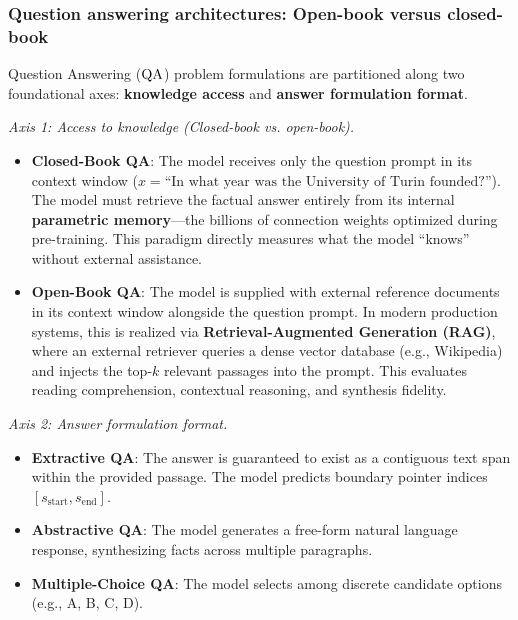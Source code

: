 \documentclass[../../../main.tex]{subfiles}
\begin{document}
\subsubsection{Question answering architectures: Open-book versus closed-book}
\label{subsec:question_answering}
Question Answering ($\mathrm{QA}$) problem formulations are partitioned along two foundational axes: \textbf{knowledge access} and \textbf{answer formulation format}.

\textit{Axis 1: Access to knowledge (Closed-book vs. open-book).}
\begin{itemize}
    \item \textbf{Closed-Book QA}: The model receives only the question prompt in its context window ($x = \text{``In what year was the University of Turin founded?''}$). The model must retrieve the factual answer entirely from its internal \textbf{parametric memory}---the billions of connection weights optimized during pre-training. This paradigm directly measures what the model ``knows'' without external assistance.
    \item \textbf{Open-Book QA}: The model is supplied with external reference documents in its context window alongside the question prompt. In modern production systems, this is realized via \textbf{Retrieval-Augmented Generation (RAG)}, where an external retriever queries a dense vector database (e.g., Wikipedia) and injects the top-$k$ relevant passages into the prompt. This evaluates reading comprehension, contextual reasoning, and synthesis fidelity.
\end{itemize}

\textit{Axis 2: Answer formulation format.}
\begin{itemize}
    \item \textbf{Extractive QA}: The answer is guaranteed to exist as a contiguous text span within the provided passage. The model predicts boundary pointer indices $[s_{\text{start}}, s_{\text{end}}]$.
    \item \textbf{Abstractive QA}: The model generates a free-form natural language response, synthesizing facts across multiple paragraphs.
    \item \textbf{Multiple-Choice QA}: The model selects among discrete candidate options (e.g., A, B, C, D).
\end{itemize}
\end{document}
